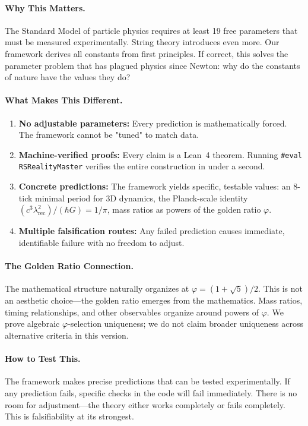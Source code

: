 \documentclass[11pt,a4paper,twoside]{article}
\numberwithin{equation}{section}
\theoremstyle{customthm}
\theoremstyle{customdef}
\theoremstyle{customrem}
\begin{document}
\paragraph{Why This Matters.} The Standard Model of particle physics requires at least 19 free parameters that must be measured experimentally. String theory introduces even more. Our framework derives all constants from first principles. If correct, this solves the parameter problem that has plagued physics since Newton: why do the constants of nature have the values they do?

\paragraph{What Makes This Different.}
\begin{enumerate}[leftmargin=*,topsep=0pt,itemsep=2pt]
\item \textbf{No adjustable parameters:} Every prediction is mathematically forced. The framework cannot be "tuned" to match data.
\item \textbf{Machine-verified proofs:} Every claim is a Lean~4 theorem. Running \texttt{\#eval RSRealityMaster} verifies the entire construction in under a second.
\item \textbf{Concrete predictions:} The framework yields specific, testable values: an 8-tick minimal period for 3D dynamics, the Planck-scale identity $(c^3\lambda_{\mathrm{rec}}^2)/(\hbar G) = 1/\pi$, mass ratios as powers of the golden ratio $\varphi$.
\item \textbf{Multiple falsification routes:} Any failed prediction causes immediate, identifiable failure with no freedom to adjust.
\end{enumerate}

\paragraph{The Golden Ratio Connection.} The mathematical structure naturally organizes at $\varphi = (1+\sqrt{5})/2$. This is not an aesthetic choice—the golden ratio emerges from the mathematics. Mass ratios, timing relationships, and other observables organize around powers of $\varphi$. We prove algebraic $\varphi$‑selection uniqueness; we do not claim broader uniqueness across alternative criteria in this version.

\paragraph{How to Test This.} The framework makes precise predictions that can be tested experimentally. If any prediction fails, specific checks in the code will fail immediately. There is no room for adjustment—the theory either works completely or fails completely. This is falsifiability at its strongest.
\end{document}
